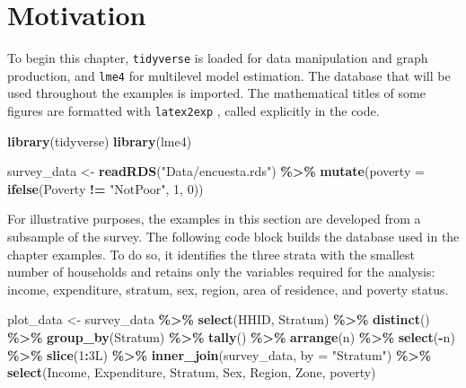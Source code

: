 \documentclass[
  english,
  12pt,
]{book}
\newenvironment{Shaded}{\begin{snugshade}}{\end{snugshade}}
\newcommand{\AttributeTok}[1]{\textcolor[rgb]{0.13,0.29,0.53}{#1}}
\newcommand{\DataTypeTok}[1]{\textcolor[rgb]{0.13,0.29,0.53}{#1}}
\newcommand{\DecValTok}[1]{\textcolor[rgb]{0.00,0.00,0.81}{#1}}
\newcommand{\FunctionTok}[1]{\textcolor[rgb]{0.13,0.29,0.53}{\textbf{#1}}}
\newcommand{\NormalTok}[1]{#1}
\newcommand{\OtherTok}[1]{\textcolor[rgb]{0.56,0.35,0.01}{#1}}
\newcommand{\SpecialCharTok}[1]{\textcolor[rgb]{0.81,0.36,0.00}{\textbf{#1}}}
\newcommand{\StringTok}[1]{\textcolor[rgb]{0.31,0.60,0.02}{#1}}
\begin{document}
\section{Motivation}\label{sec-motivacionMult}

To begin this chapter, \texttt{tidyverse} \citep{tidyverse2026} is loaded for data manipulation and graph production, and \texttt{lme4} \citep{lme42026} for multilevel model estimation. The database that will be used throughout the examples is imported. The mathematical titles of some figures are formatted with \texttt{latex2exp} \citep{latex2exp2026}, called explicitly in the code.

\begin{Shaded}
\begin{Highlighting}[]
\FunctionTok{library}\NormalTok{(tidyverse)}
\FunctionTok{library}\NormalTok{(lme4)}
\end{Highlighting}
\end{Shaded}

\begin{Shaded}
\begin{Highlighting}[]
\NormalTok{survey\_data }\OtherTok{\textless{}{-}} \FunctionTok{readRDS}\NormalTok{(}\StringTok{"Data/encuesta.rds"}\NormalTok{) }\SpecialCharTok{\%\textgreater{}\%}
  \FunctionTok{mutate}\NormalTok{(}\AttributeTok{poverty =} \FunctionTok{ifelse}\NormalTok{(Poverty }\SpecialCharTok{!=} \StringTok{"NotPoor"}\NormalTok{, }\DecValTok{1}\NormalTok{, }\DecValTok{0}\NormalTok{))}
\end{Highlighting}
\end{Shaded}

For illustrative purposes, the examples in this section are developed from a subsample of the survey. The following code block builds the database used in the chapter examples. To do so, it identifies the three strata with the smallest number of households and retains only the variables required for the analysis: income, expenditure, stratum, sex, region, area of residence, and poverty status.

\begin{Shaded}
\begin{Highlighting}[]
\NormalTok{plot\_data }\OtherTok{\textless{}{-}}\NormalTok{ survey\_data }\SpecialCharTok{\%\textgreater{}\%}
  \FunctionTok{select}\NormalTok{(HHID, Stratum) }\SpecialCharTok{\%\textgreater{}\%}
  \FunctionTok{distinct}\NormalTok{() }\SpecialCharTok{\%\textgreater{}\%}
  \FunctionTok{group\_by}\NormalTok{(Stratum) }\SpecialCharTok{\%\textgreater{}\%}
  \FunctionTok{tally}\NormalTok{() }\SpecialCharTok{\%\textgreater{}\%}
  \FunctionTok{arrange}\NormalTok{(n) }\SpecialCharTok{\%\textgreater{}\%}
  \FunctionTok{select}\NormalTok{(}\SpecialCharTok{{-}}\NormalTok{n) }\SpecialCharTok{\%\textgreater{}\%}
  \FunctionTok{slice}\NormalTok{(}\DecValTok{1}\SpecialCharTok{:}\DecValTok{3}\DataTypeTok{L}\NormalTok{) }\SpecialCharTok{\%\textgreater{}\%}
  \FunctionTok{inner\_join}\NormalTok{(survey\_data, }\AttributeTok{by =} \StringTok{"Stratum"}\NormalTok{) }\SpecialCharTok{\%\textgreater{}\%}
  \FunctionTok{select}\NormalTok{(Income, Expenditure, Stratum, Sex, Region, Zone, poverty)}
\end{Highlighting}
\end{Shaded}
\end{document}
